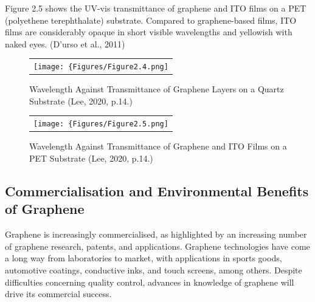 \documentclass[a4paper,12pt]{article}
\numberwithin{equation}{section}
\numberwithin{figure}{section}
\begin{document}
\noindent Figure 2.5 shows the UV-vis transmittance of graphene and ITO films on a PET (polyethene terephthalate) substrate. Compared to graphene-based films, ITO films are considerably opaque in short visible wavelengths and yellowish with naked eyes. (D’urso et al., 2011)\vspace{\baselineskip}

\begin{figure}[H]
  \centering
  \begin{tabular}{@{}c@{}}
    \texttt{[image: \{Figures/Figure2.4.png]}} \\
  \end{tabular}
  \caption{\centering Wavelength Against Transmittance of Graphene Layers on a Quartz Substrate (Lee, 2020, p.14.)}
\end{figure}

\begin{figure}[H]
  \centering
  \begin{tabular}{@{}c@{}}
    \texttt{[image: \{Figures/Figure2.5.png]}} \\
  \end{tabular}
  \caption{\centering Wavelength Against Transmittance of Graphene and ITO Films on a PET Substrate (Lee, 2020, p.14.)}
\end{figure}

\subsection{Commercialisation and Environmental Benefits of Graphene}

\noindent Graphene is increasingly commercialised, as highlighted by an increasing number of graphene research, patents, and applications. Graphene technologies have come a long way from laboratories to market, with applications in sports goods, automotive coatings, conductive inks, and touch screens, among others. Despite difficulties concerning quality control, advances in knowledge of graphene will drive its commercial success.\vspace{\baselineskip}
\end{document}
